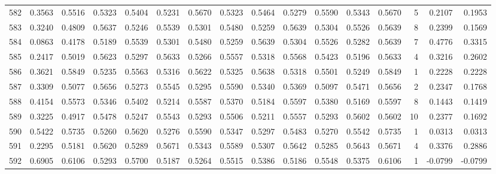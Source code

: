 \begin{tabular}{lrrrrrrrrrrrrrrr}
582 &      0.3563 &  0.5516 &  0.5323 &  0.5404 &  0.5231 &  0.5670 &  0.5323 &  0.5464 &  0.5279 &  0.5590 &   0.5343 &     0.5670 &      5 &                    0.2107 &                     0.1953 \\
583 &      0.3240 &  0.4809 &  0.5637 &  0.5246 &  0.5539 &  0.5301 &  0.5480 &  0.5259 &  0.5639 &  0.5304 &   0.5526 &     0.5639 &      8 &                    0.2399 &                     0.1569 \\
584 &      0.0863 &  0.4178 &  0.5189 &  0.5539 &  0.5301 &  0.5480 &  0.5259 &  0.5639 &  0.5304 &  0.5526 &   0.5282 &     0.5639 &      7 &                    0.4776 &                     0.3315 \\
585 &      0.2417 &  0.5019 &  0.5623 &  0.5297 &  0.5633 &  0.5266 &  0.5557 &  0.5318 &  0.5568 &  0.5423 &   0.5196 &     0.5633 &      4 &                    0.3216 &                     0.2602 \\
586 &      0.3621 &  0.5849 &  0.5235 &  0.5563 &  0.5316 &  0.5622 &  0.5325 &  0.5638 &  0.5318 &  0.5501 &   0.5249 &     0.5849 &      1 &                    0.2228 &                     0.2228 \\
587 &      0.3309 &  0.5077 &  0.5656 &  0.5273 &  0.5545 &  0.5295 &  0.5590 &  0.5340 &  0.5369 &  0.5097 &   0.5471 &     0.5656 &      2 &                    0.2347 &                     0.1768 \\
588 &      0.4154 &  0.5573 &  0.5346 &  0.5402 &  0.5214 &  0.5587 &  0.5370 &  0.5184 &  0.5597 &  0.5380 &   0.5169 &     0.5597 &      8 &                    0.1443 &                     0.1419 \\
589 &      0.3225 &  0.4917 &  0.5478 &  0.5247 &  0.5543 &  0.5293 &  0.5506 &  0.5211 &  0.5557 &  0.5293 &   0.5602 &     0.5602 &     10 &                    0.2377 &                     0.1692 \\
590 &      0.5422 &  0.5735 &  0.5260 &  0.5620 &  0.5276 &  0.5590 &  0.5347 &  0.5297 &  0.5483 &  0.5270 &   0.5542 &     0.5735 &      1 &                    0.0313 &                     0.0313 \\
591 &      0.2295 &  0.5181 &  0.5620 &  0.5289 &  0.5671 &  0.5343 &  0.5589 &  0.5307 &  0.5642 &  0.5285 &   0.5643 &     0.5671 &      4 &                    0.3376 &                     0.2886 \\
592 &      0.6905 &  0.6106 &  0.5293 &  0.5700 &  0.5187 &  0.5264 &  0.5515 &  0.5386 &  0.5186 &  0.5548 &   0.5375 &     0.6106 &      1 &                   -0.0799 &                    -0.0799 \\

\end{tabular}
